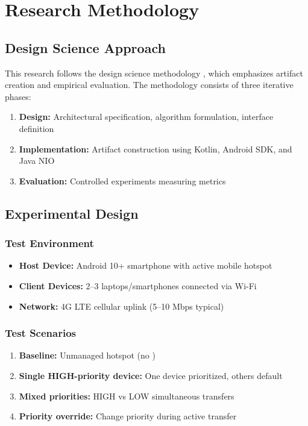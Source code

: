 \chapter{Research Methodology}
\label{ch:methodology}

\section{Design Science Approach}

This research follows the design science methodology \cite{hevner2004design}, which emphasizes artifact creation and empirical evaluation. The methodology consists of three iterative phases:

\begin{enumerate}
    \item \textbf{Design:} Architectural specification, algorithm formulation, interface definition
    \item \textbf{Implementation:} Artifact construction using Kotlin, Android SDK, and Java NIO
    \item \textbf{Evaluation:} Controlled experiments measuring \qos metrics
\end{enumerate}

\section{Experimental Design}

\subsection{Test Environment}

\begin{itemize}
    \item \textbf{Host Device:} Android 10+ smartphone with active mobile hotspot
    \item \textbf{Client Devices:} 2–3 laptops/smartphones connected via Wi-Fi
    \item \textbf{Network:} 4G LTE cellular uplink (5–10 Mbps typical)
\end{itemize}

\subsection{Test Scenarios}

\begin{enumerate}
    \item \textbf{Baseline:} Unmanaged hotspot (no \qos)
    \item \textbf{Single HIGH-priority device:} One device prioritized, others default
    \item \textbf{Mixed priorities:} HIGH vs LOW simultaneous transfers
    \item \textbf{Priority override:} Change priority during active transfer
\end{enumerate}


